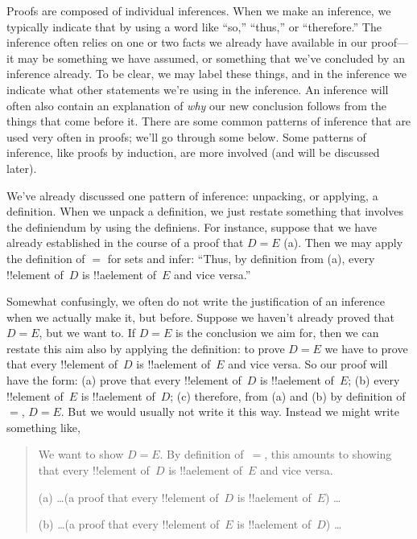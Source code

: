 \documentclass[../../../include/open-logic-section]{subfiles}
\begin{document}

Proofs are composed of individual inferences. When we make an
inference, we typically indicate that by using a word like ``so,''
``thus,'' or ``therefore.''  The inference often relies on one or two
facts we already have available in our proof---it may be something we
have assumed, or something that we've concluded by an inference
already.  To be clear, we may label these things, and in the inference
we indicate what other statements we're using in the inference.  An
inference will often also contain an explanation of \emph{why} our new
conclusion follows from the things that come before it.  There are
some common patterns of inference that are used very often in proofs;
we'll go through some below. Some patterns of inference, like proofs
by induction, are more involved (and will be discussed later).

We've already discussed one pattern of inference: unpacking, or
applying, a definition. When we unpack a definition, we just restate
something that involves the definiendum by using the definiens. For
instance, suppose that we have already established in the course of a
proof that $D = E$ (a). Then we may apply the definition of $=$ for sets
and infer: ``Thus, by definition from (a), every !!{element}
of~$D$ is !!a{element} of~$E$ and vice versa.''

Somewhat confusingly, we often do not write the justification of an
inference when we actually make it, but before.  Suppose we haven't
already proved that $D = E$, but we want to.  If $D = E$ is the
conclusion we aim for, then we can restate this aim also by applying
the definition: to prove $D = E$ we have to prove that every
!!{element} of~$D$ is !!a{element} of~$E$ and vice versa.  So our
proof will have the form: (a) prove that every !!{element} of~$D$ is
!!a{element} of~$E$; (b) every !!{element} of~$E$ is !!a{element}
of~$D$; (c) therefore, from (a) and (b) by definition of $=$, $D = E$.
But we would usually not write it this way. Instead we might write
something like,
\begin{quote}
We want to show $D = E$. By definition of~$=$, this amounts to showing
that every !!{element} of~$D$ is !!a{element} of~$E$ and vice
versa.

(a) \dots (a proof that every !!{element} of~$D$ is !!a{element}
of~$E$) \dots

(b) \dots (a proof that every !!{element}
of~$E$ is !!a{element} of~$D$) \dots
\end{quote}
\end{document}
